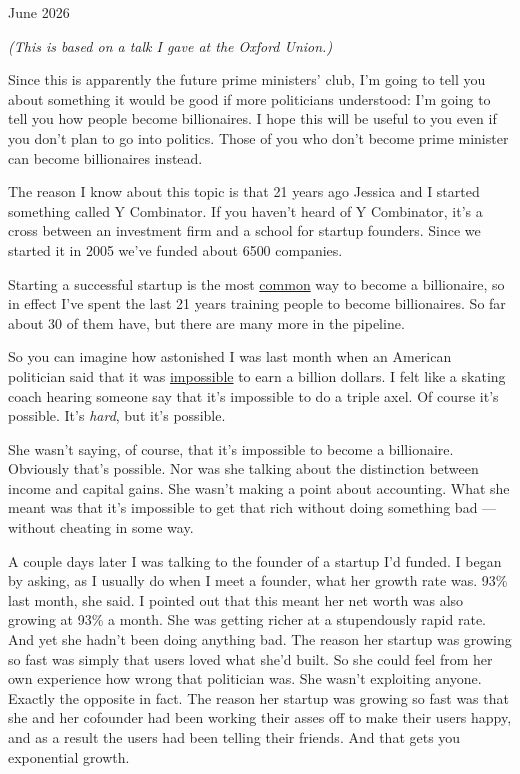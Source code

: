 June 2026

\emph{(This is based on a talk I gave at the Oxford Union.)}

Since this is apparently the future prime ministers' club, I'm going to
tell you about something it would be good if more politicians
understood: I'm going to tell you how people become billionaires. I hope
this will be useful to you even if you don't plan to go into politics.
Those of you who don't become prime minister can become billionaires
instead.

The reason I know about this topic is that 21 years ago Jessica and I
started something called Y Combinator. If you haven't heard of Y
Combinator, it's a cross between an investment firm and a school for
startup founders. Since we started it in 2005 we've funded about 6500
companies.

Starting a successful startup is the most \href{richnow.html}{common}
way to become a billionaire, so in effect I've spent the last 21 years
training people to become billionaires. So far about 30 of them have,
but there are many more in the pipeline.

So you can imagine how astonished I was last month when an American
politician said that it was
\href{https://x.com/MarcoFoster_/status/2052427151371047016}{impossible}
to earn a billion dollars. I felt like a skating coach hearing someone
say that it's impossible to do a triple axel. Of course it's possible.
It's \emph{hard}, but it's possible.

She wasn't saying, of course, that it's impossible to become a
billionaire. Obviously that's possible. Nor was she talking about the
distinction between income and capital gains. She wasn't making a point
about accounting. What she meant was that it's impossible to get that
rich without doing something bad --- without cheating in some way.

A couple days later I was talking to the founder of a startup I'd
funded. I began by asking, as I usually do when I meet a founder, what
her growth rate was. 93\% last month, she said. I pointed out that this
meant her net worth was also growing at 93\% a month. She was getting
richer at a stupendously rapid rate. And yet she hadn't been doing
anything bad. The reason her startup was growing so fast was simply that
users loved what she'd built. So she could feel from her own experience
how wrong that politician was. She wasn't exploiting anyone. Exactly the
opposite in fact. The reason her startup was growing so fast was that
she and her cofounder had been working their asses off to make their
users happy, and as a result the users had been telling their friends.
And that gets you exponential growth.


